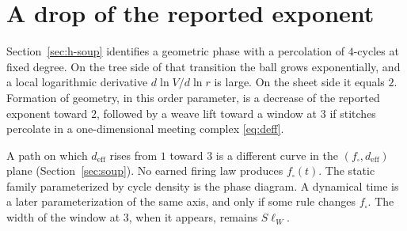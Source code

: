 \section{A drop of the reported exponent}
\label{sec:h-bb}

Section~\ref{sec:h-soup} identifies a geometric phase with a percolation
of \(4\)-cycles at fixed degree.
On the tree side of that transition the ball grows exponentially, and a
local logarithmic derivative \(d\ln V/d\ln r\) is large.
On the sheet side it equals \(2\).
Formation of geometry, in this order parameter, is a decrease of the
reported exponent toward \(2\), followed by a weave lift toward a window
at \(3\) if stitches percolate in a one-dimensional meeting complex
\eqref{eq:deff}.

A path on which \(d_{\mathrm{eff}}\) rises from \(1\) toward \(3\) is a
different curve in the \((f_\square,d_{\mathrm{eff}})\) plane
(Section~\ref{sec:soup}).
No earned firing law produces \(f_\square(t)\).
The static family parameterized by cycle density is the phase diagram.
A dynamical time is a later parameterization of the same axis, and only
if some rule changes \(f_\square\).
The width of the window at \(3\), when it appears, remains \(S\ell_W\).
